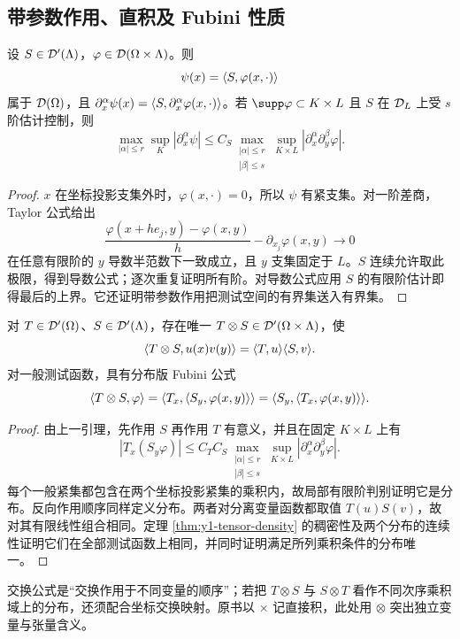 \subsection{带参数作用、直积及 Fubini 性质}
\begin{lemma}[分布作用后的参数函数仍是测试函数]\label{lem:y1-parameter}
设 $S\in\mathcal{D}'(\Lambda)$，$\varphi\in\mathcal{D}(\Omega\times\Lambda)$。则
\[
 \psi(x)=\langle S,\varphi(x,\cdot)\rangle
\]
属于 $\mathcal{D}(\Omega)$，且 $\partial_x^\alpha\psi(x)=\langle S,\partial_x^\alpha\varphi(x,\cdot)\rangle$。若 $\supp\varphi\subset K\times L$ 且 $S$ 在 $\mathcal{D}_L$ 上受 $s$ 阶估计控制，则
\[
 \max_{|\alpha|\le r}\sup_K|\partial_x^\alpha\psi|
 \le C_S\max_{\substack{|\alpha|\le r\\|\beta|\le s}}
 \sup_{K\times L}|\partial_x^\alpha\partial_y^\beta\varphi|.
\]
\end{lemma}
\begin{proof}
$x$ 在坐标投影支集外时，$\varphi(x,\cdot)=0$，所以 $\psi$ 有紧支集。对一阶差商，Taylor 公式给出
\[
 \frac{\varphi(x+he_j,y)-\varphi(x,y)}h-\partial_{x_j}\varphi(x,y)
 \longrightarrow0
\]
在任意有限阶的 $y$ 导数半范数下一致成立，且 $y$ 支集固定于 $L$。$S$ 连续允许取此极限，得到导数公式；逐次重复证明所有阶。对导数公式应用 $S$ 的有限阶估计即得最后的上界。它还证明带参数作用把测试空间的有界集送入有界集。
\end{proof}

\begin{theorem}\label{thm:y1-tensor}
对 $T\in\mathcal{D}'(\Omega)$、$S\in\mathcal{D}'(\Lambda)$，存在唯一 $T\otimes S\in\mathcal{D}'(\Omega\times\Lambda)$，使
\[
 \langle T\otimes S,u(x)v(y)\rangle=\langle T,u\rangle\langle S,v\rangle.
\]
对一般测试函数，具有分布版 Fubini 公式
\[
 \langle T\otimes S,\varphi\rangle
 =\langle T_x,\langle S_y,\varphi(x,y)\rangle\rangle
 =\langle S_y,\langle T_x,\varphi(x,y)\rangle\rangle.
\]
\end{theorem}
\begin{proof}
由上一引理，先作用 $S$ 再作用 $T$ 有意义，并且在固定 $K\times L$ 上有
\[
 |T_x(S_y\varphi)|\le C_TC_S
 \max_{\substack{|\alpha|\le r\\|\beta|\le s}}
 \sup_{K\times L}|\partial_x^\alpha\partial_y^\beta\varphi|.
\]
每个一般紧集都包含在两个坐标投影紧集的乘积内，故局部有限阶判别证明它是分布。反向作用顺序同样定义分布。两者对分离变量函数都取值 $T(u)S(v)$，故对其有限线性组合相同。定理 \ref{thm:y1-tensor-density} 的稠密性及两个分布的连续性证明它们在全部测试函数上相同，并同时证明满足所列乘积条件的分布唯一。
\end{proof}
交换公式是“交换作用于不同变量的顺序”；若把 $T\otimes S$ 与 $S\otimes T$ 看作不同次序乘积域上的分布，还须配合坐标交换映射。原书以 $\times$ 记直接积，此处用 $\otimes$ 突出独立变量与张量含义。

